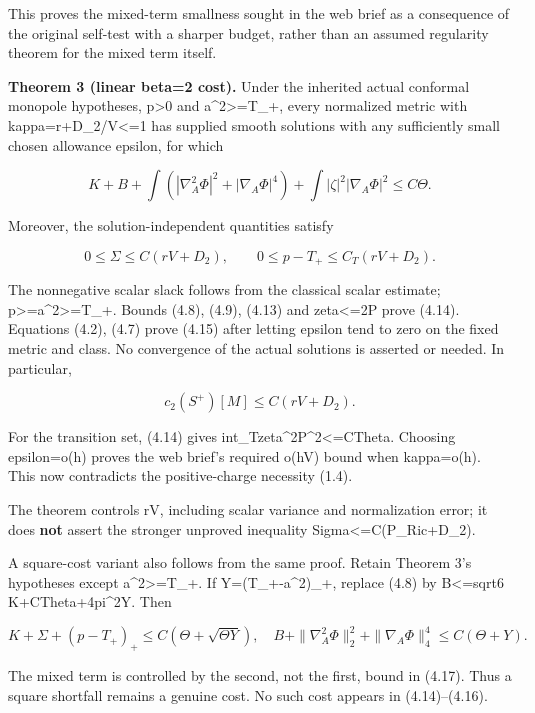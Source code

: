 \documentclass[
  10pt,
]{article}
\begin{document}
This proves the mixed-term smallness sought in the web brief as a
consequence of the original self-test with a sharper budget, rather than
an assumed regularity theorem for the mixed term itself.

\textbf{Theorem 3 (linear beta=2 cost).} Under the inherited actual
conformal monopole hypotheses, p\textgreater0 and
a\^{}2\textgreater=T\_+, every normalized metric with
kappa=r+D\_2/V\textless=1 has supplied smooth solutions with any
sufficiently small chosen allowance epsilon, for which

\[
 K+B+\int(|\nabla_A^2\Phi|^2+|\nabla_A\Phi|^4)
             +\int|\zeta|^2|\nabla_A\Phi|^2\le C\Theta. 
                                                               \tag{4.14}
\]

Moreover, the solution-independent quantities satisfy

\[
 \boxed{0\le\Sigma\le C(rV+D_2),\qquad
         0\le p-T_+\le C_T(rV+D_2).}                 \tag{4.15}
\]

The nonnegative scalar slack follows from the classical scalar estimate;
p\textgreater=a\^{}2\textgreater=T\_+. Bounds (4.8), (4.9), (4.13) and
\textbar zeta\textbar\textless=2\textbar P\textbar{} prove (4.14).
Equations (4.2), (4.7) prove (4.15) after letting epsilon tend to zero
on the fixed metric and class. No convergence of the actual solutions is
asserted or needed. In particular,

\[
                     c_2(S^+)[M]\le C(rV+D_2).       \tag{4.16}
\]

For the transition set, (4.14) gives
int\_T\textbar zeta\textbar\^{}2\textbar P\textbar\^{}2\textless=CTheta.
Choosing epsilon=o(h) proves the web brief's required o(hV) bound when
kappa=o(h). This now contradicts the positive-charge necessity (1.4).

The theorem controls rV, including scalar variance and normalization
error; it does \textbf{not} assert the stronger unproved inequality
Sigma\textless=C(P\_Ric+D\_2).

A square-cost variant also follows from the same proof. Retain Theorem
3's hypotheses except a\^{}2\textgreater=T\_+. If Y=(T\_+-a\^{}2)\_+,
replace (4.8) by B\textless=sqrt6 K+CTheta+4pi\^{}2Y. Then

\[
 K+\Sigma+(p-T_+)_+\le C(\Theta+\sqrt{\Theta Y}),
 \quad
 B+\|\nabla_A^2\Phi\|_2^2+\|\nabla_A\Phi\|_4^4
                   \le C(\Theta+Y).                 \tag{4.17}
\]

The mixed term is controlled by the second, not the first, bound in
(4.17). Thus a square shortfall remains a genuine cost. No such cost
appears in (4.14)--(4.16).
\end{document}
